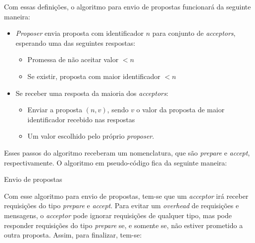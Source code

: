 \documentclass[12pt,
openright, 
oneside,
a4paper,
brazil]{facom-ufu-abntex2}
\theoremstyle{definition}
\begin{document}
Com essas definições, o algoritmo para envio de propostas funcionará da seguinte maneira:

\begin{itemize}
    \item[]\textit{Proposer} envia proposta com identificador $n$ para conjunto de 
\textit{acceptors}, esperando uma das seguintes respostas:

    \begin{itemize}
        \item[] Promessa de não aceitar valor $<n$
        \item[] Se existir, proposta com maior identificador $<n$
    \end{itemize}
    
    \item[]Se receber uma resposta da maioria dos \textit{acceptors}:
    \begin{itemize}
        \item[] Enviar a proposta $(n, v)$, sendo $v$ o valor da proposta de maior identificador
        recebido nas respostas
        \item[] Um valor escolhido pelo próprio \textit{proposer}.
    \end{itemize}
\end{itemize}

Esses passos do algoritmo receberam um nomenclatura, que são \textit{prepare} e
\textit{accept}, respectivamente. O algoritmo em pseudo-código fica da seguinte maneira:

\begin{algorithm}[H]
\caption{Envio de propostas}
\SetAlgoLined
{}
\end{algorithm}

Com esse algoritmo para envio de propostas, tem-se que um \textit{acceptor} irá
receber requisições do tipo \textit{prepare} e \textit{accept}. Para evitar um \textit{overhead}
de requisições e mensagens, o \textit{acceptor} pode ignorar requisições de qualquer tipo,
mas pode responder requisições do tipo \textit{prepare} se, e somente se, não estiver
prometido a outra proposta. Assim, para finalizar, tem-se:
\end{document}
